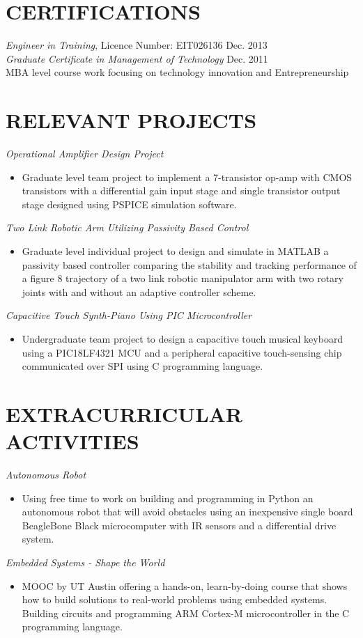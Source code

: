 \documentclass{res}
\begin{document}
\begin{resume}
 
\section{CERTIFICATIONS}          
	\emph{Engineer in Training},  Licence Number:  EIT026136 \hfill Dec. 2013 \\
	\emph{Graduate Certificate in Management of Technology} \hfill Dec. 2011 \\
	MBA level course work focusing on technology innovation and Entrepreneurship
	     
 
\section{RELEVANT PROJECTS}         
	 	\textit{Operational Amplifier Design Project}
	 	\begin{itemize}
	 		\item Graduate level team project to implement a 7-transistor op-amp with CMOS transistors with a differential gain input stage and single transistor output stage designed using PSPICE simulation software.
	 	\end{itemize}
	 	\textit{Two Link Robotic Arm Utilizing Passivity Based Control}
	 	\begin{itemize}
	 		\item Graduate level individual project to design and simulate in MATLAB a passivity based controller comparing the stability and tracking performance of a figure 8 trajectory of a two link robotic manipulator arm with two rotary joints with and without an adaptive controller scheme.  
	 	\end{itemize}
	 	\textit{Capacitive Touch Synth-Piano Using PIC Microcontroller}
	 	\begin{itemize}
	 		\item Undergraduate team project to design a capacitive touch musical keyboard using a PIC18LF4321 MCU and a peripheral capacitive touch-sensing chip communicated over SPI using C programming language.
	 	\end{itemize}
        

\section{EXTRACURRICULAR ACTIVITIES}
	 	\textit{Autonomous Robot}
	 	\begin{itemize}
	 		\item  Using free time to work on building and programming in Python an autonomous robot that will avoid obstacles using an inexpensive single board BeagleBone Black microcomputer with IR sensors and a differential drive system. 
	 	\end{itemize}	 	
	 	\textit{Embedded Systems - Shape the World}
	 	\begin{itemize}
	 		\item MOOC by UT Austin offering a hands-on, learn-by-doing course that shows how to build solutions to real-world problems using embedded systems. Building circuits and programming ARM Cortex-M microcontroller in the C programming language.
	 	\end{itemize}


\end{resume}
\end{document}
